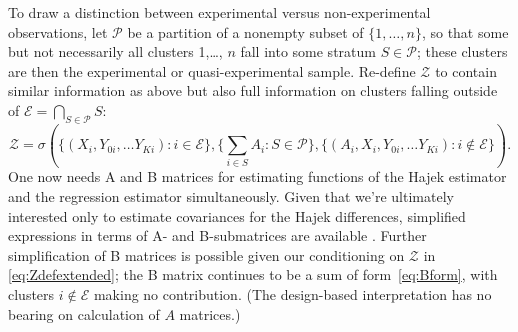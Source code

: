 To draw a distinction between experimental versus non-experimental
observations, let $\mathcal{P}$ be a partition of a nonempty subset of
$\{1, \ldots, n\}$, so that some but not necessarily all clusters
1,\ldots, $n$ fall into some stratum $S \in
\mathcal{P}$; these clusters are then the experimental or
quasi-experimental sample. Re-define $\mathcal{Z}$ to contain similar information
as above but also full information on clusters falling outside of
$\mathcal{E} = \bigcap_{S \in \mathcal{P}}S$:
\begin{equation} \label{eq:Zdefextended}
  \mathcal{Z} = \sigma\left(\{(X_i, Y_{0i}, \ldots Y_{Ki}): i \in \mathcal{E}\}, \{\sum_{i
    \in S} A_i : S  \in \mathcal{P}\} , \{(A_{i}, X_i, Y_{0i}, \ldots
  Y_{Ki}): i \not\in\mathcal{E}\}\right).
\end{equation}
One now needs A and B matrices for estimating functions of the Hajek
estimator and the regression estimator simultaneously.  Given that
we're ultimately interested only to estimate covariances for the Hajek
differences, simplified expressions in terms of A- and B-submatrices
are available \citep[e.g.][p.373 of \S~A.6.6.]{carroll2006measurement}.  Further
simplification of B matrices is possible given our conditioning on
$\mathcal{Z}$ in \eqref{eq:Zdefextended}; the B matrix continues to be
a sum of form~\eqref{eq:Bform}, with clusters $i\not\in \mathcal{E}$
making no contribution. (The design-based interpretation has no bearing on
calculation of \(A\) matrices.)

